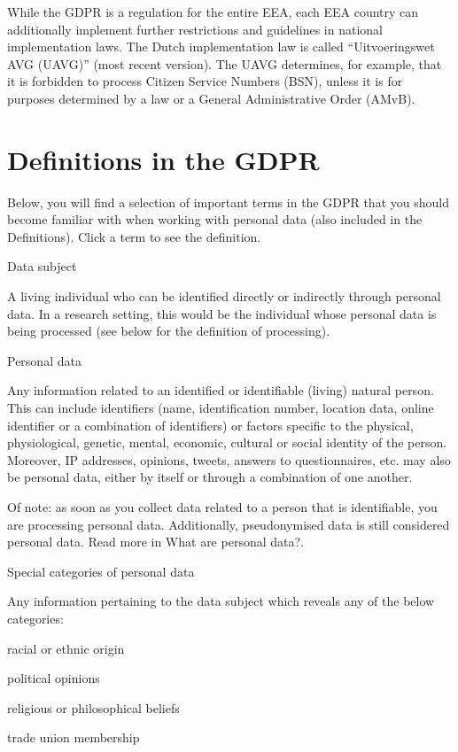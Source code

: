 \documentclass[
]{book}
\begin{document}
While the GDPR is a regulation for the entire EEA, each EEA country can additionally
implement further restrictions and guidelines in national implementation laws. The
Dutch implementation law is called ``Uitvoeringswet AVG (UAVG)''
(most recent version).
The UAVG determines, for example, that it is forbidden to process Citizen
Service Numbers (BSN), unless it is for purposes determined by a law or a
General Administrative Order (AMvB).

\hypertarget{definitions}{%
\section{Definitions in the GDPR}\label{definitions}}

Below, you will find a selection of important terms in the GDPR that you should
become familiar with when working with personal data (also included in the
Definitions). Click a term to see the definition.

Data subject

A living individual who can be identified directly or indirectly through
personal data. In a research setting, this would be the individual whose
personal data is being processed (see below for the definition of processing).

Personal data

Any information related to an identified or identifiable (living) natural
person. This can include identifiers (name, identification number, location
data, online identifier or a combination of identifiers) or factors specific
to the physical, physiological, genetic, mental, economic, cultural or social
identity of the person. Moreover, IP addresses, opinions, tweets, answers to
questionnaires, etc. may also be personal data, either by itself or through a
combination of one another.

Of note: as soon as you collect data related to a person that is identifiable,
you are processing personal data. Additionally, pseudonymised data is still
considered personal data. Read more in
What are personal data?.

Special categories of personal data

Any information pertaining to the data subject which reveals any of the below categories:

racial or ethnic origin

political opinions

religious or philosophical beliefs

trade union membership
\end{document}
